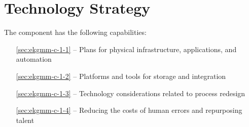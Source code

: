 \chapter{Technology Strategy}\label{ch:ekgmm-c-1}

The  component has the following capabilities:

\begin{itemize}[leftmargin=.5in]
  \item [\ref{sec:ekgmm-c-1-1}]  -- Plans for physical infrastructure, applications, and automation
  \item [\ref{sec:ekgmm-c-1-2}]  -- Platforms and tools for storage and integration
  \item [\ref{sec:ekgmm-c-1-3}]  -- Technology considerations related to process redesign
  \item [\ref{sec:ekgmm-c-1-4}]  -- Reducing the costs of human errors and repurposing talent
\end{itemize}





